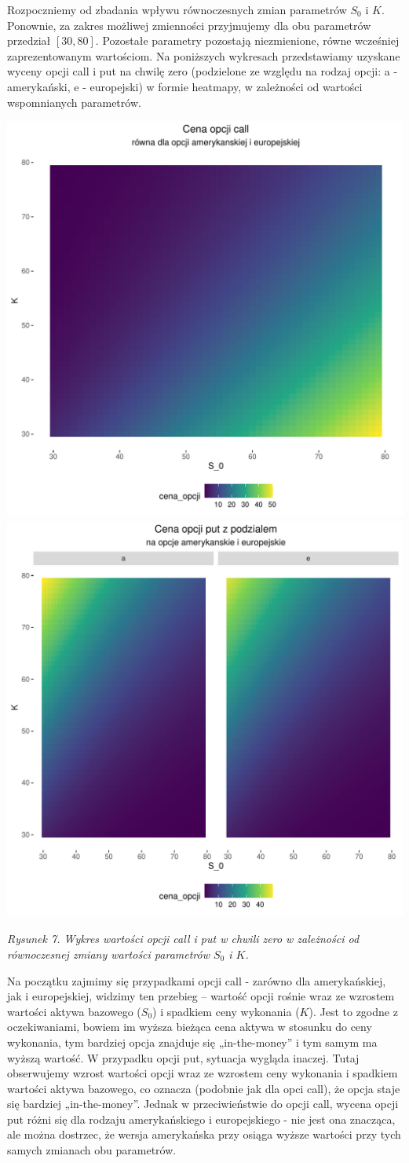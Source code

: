 \documentclass[
]{article}
\begin{document}
Rozpoczniemy od zbadania wpływu równoczesnych zmian parametrów \(S_0\) i
\(K\). Ponownie, za zakres możliwej zmienności przyjmujemy dla obu
parametrów przedział \([30, 80]\). Pozostałe parametry pozostają
niezmienione, równe wcześniej zaprezentowanym wartościom. Na poniższych
wykresach przedstawiamy uzyskane wyceny opcji call i put na chwilę zero
(podzielone ze względu na rodzaj opcji: a - amerykański, e - europejski)
w formie heatmapy, w zależności od wartości wspomnianych parametrów.

\begin{center}\includegraphics[width=0.45\linewidth]{wykresy/c_r_S0_r_K} \includegraphics[width=0.45\linewidth]{wykresy/p_r_S0_r_K} \end{center}

\emph{Rysunek 7. Wykres wartości opcji call i put w chwili zero w
zależności od równoczesnej zmiany wartości parametrów \(S_0\) i \(K\).}

Na początku zajmimy się przypadkami opcji call - zarówno dla
amerykańskiej, jak i europejskiej, widzimy ten przebieg -- wartość opcji
rośnie wraz ze wzrostem wartości aktywa bazowego (\(S_0\)) i spadkiem
ceny wykonania (\(K\)). Jest to zgodne z oczekiwaniami, bowiem im wyższa
bieżąca cena aktywa w stosunku do ceny wykonania, tym bardziej opcja
znajduje się „in-the-money'' i tym samym ma wyższą wartość. W przypadku
opcji put, sytuacja wygląda inaczej. Tutaj obserwujemy wzrost wartości
opcji wraz ze wzrostem ceny wykonania i spadkiem wartości aktywa
bazowego, co oznacza (podobnie jak dla opci call), że opcja staje się
bardziej „in-the-money''. Jednak w przeciwieństwie do opcji call, wycena
opcji put różni się dla rodzaju amerykańskiego i europejskiego - nie
jest ona znacząca, ale można dostrzec, że wersja amerykańska przy osiąga
wyższe wartości przy tych samych zmianach obu parametrów.
\end{document}
